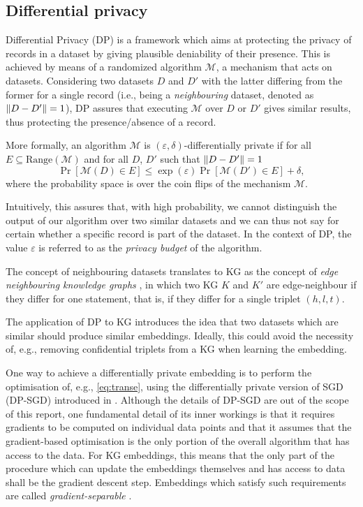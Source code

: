 \subsection{Differential privacy}\label{sec:dp}

Differential Privacy (DP) \parencite{dwork2008differential, dwork2014algorithmic} is a framework which aims at protecting the privacy of records in a dataset by giving plausible deniability of their presence.
This is achieved by means of a randomized algorithm $\mathcal{M}$, a mechanism that acts on datasets.
Considering two datasets $D$ and $D'$ with the latter differing from the former for a single record (i.e., being a \emph{neighbouring} dataset, denoted as $\left\lVert D - D'\right\rVert = 1$), DP assures that executing $\mathcal{M}$ over $D$ or $D'$ gives similar results, thus protecting the presence/absence of a record.

More formally, an algorithm $\mathcal{M}$ is $(\varepsilon, \delta)$-differentially private if for all $E \subseteq \text{Range}(\mathcal{M})$ and for all $D$, $D'$ such that $\left\lVert D - D'\right\rVert = 1$
$$ \Pr[\mathcal{M}(D) \in E] \le \exp{(\varepsilon)}\Pr[\mathcal{M}(D') \in E] + \delta,$$
where the probability space is over the coin flips of the mechanism $\mathcal{M}$.

Intuitively, this assures that, with high probability, we cannot distinguish the output of our algorithm over two similar datasets and we can thus not say for certain whether a specific record is part of the dataset.
In the context of DP, the value $\varepsilon$ is referred to as the \emph{privacy budget} of the algorithm.

The concept of neighbouring datasets translates to KG  as the concept of \emph{edge neighbouring knowledge graphs} \parencite{han2022framework}, in which two KG $K$ and $K'$ are edge-neighbour if they differ for one statement, that is, if they differ for a single triplet $(h, l, t)$.

The application of DP to KG introduces the idea that two datasets which are similar should produce similar embeddings.
Ideally, this could avoid the necessity of, e.g., removing confidential triplets from a KG when learning the embedding.

One way to achieve a differentially private embedding is to perform the optimisation of, e.g., \cref{eq:transe}, using the differentially private version of SGD (DP-SGD) introduced in \cite{abadi2016deep}.
Although the details of DP-SGD are out of the scope of this report, one fundamental detail of its inner workings is that it requires gradients to be computed on individual data points and that it assumes that the gradient-based optimisation is the only portion of the overall algorithm that has access to the data.
For KG embeddings, this means that the only part of the procedure which can update the embeddings themselves and has access to data shall be the gradient descent step. 
Embeddings which satisfy such requirements are called \emph{gradient-separable} \parencite{han2022framework}.

